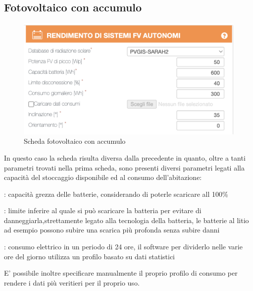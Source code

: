 \subsection{Fotovoltaico con accumulo}
\begin{figure}[H]
    \centering
    \includegraphics[height=0.5\textwidth]{res/cap 4/fotovoltaico con accumulo}
    \caption{Scheda fotovoltaico con accumulo}
\end{figure}\noindent
In questo caso la scheda risulta diversa dalla precedente in quanto, oltre a tanti parametri trovati nella prima scheda, sono presenti diversi parametri legati alla capacità del stoccaggio disponibile ed al consumo dell'abitazione:
\begin{description}[labelindent=5mm]
    \item[$\bullet$ Capacità batteria]: capacità grezza delle batterie, considerando di poterle scaricare all 100\%
    \item[$\bullet$ Limite di disconnessione]: limite inferire al quale si può scaricare la batteria per evitare di danneggiarla,strettamente legato alla tecnologia della batteria, le batterie al litio ad esempio possono subire una scarica più profonda senza subire danni
    \item[$\bullet$ Consumo giornaliero]: consumo elettrico in un periodo di 24 ore, il software per dividerlo nelle varie ore del giorno utilizza un profilo basato su dati statistici
\end{description}
E' possibile inoltre specificare manualmente il proprio profilo di consumo per rendere i dati più veritieri per il proprio uso.
\vfill
\newpage
